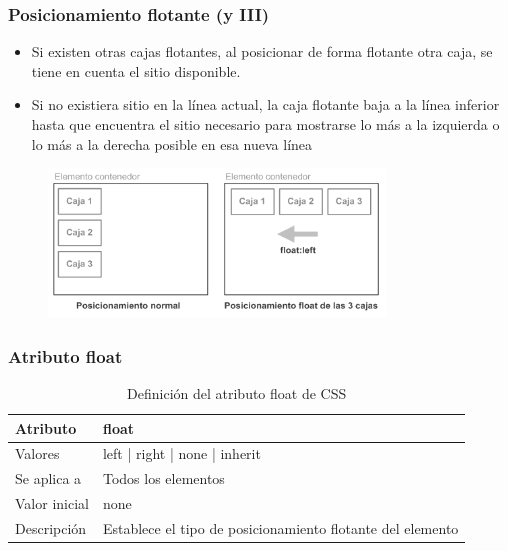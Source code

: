 \documentclass[ucs]{beamer}
\begin{document}
\begin{frame}
\frametitle{Posicionamiento flotante (y III)}

\begin{itemize}
  \item Si existen otras cajas flotantes, al posicionar de forma flotante otra caja, se tiene en cuenta el sitio disponible.
  \item Si no existiera sitio en la línea actual, la caja flotante baja a la línea inferior hasta que encuentra el sitio necesario para mostrarse lo más a la izquierda o lo más a la derecha posible en esa nueva línea
\end{itemize}


\begin{center}
\begin{figure}[p]
\includegraphics[width=0.8\textwidth]{figs/f0509.png}
\end{figure}
\end{center}

\end{frame}



\begin{frame}
\frametitle{Atributo float}

\begin{center}
  \begin{table}
   \begin{tabular}{p{1.8cm}p{7.8cm}}
Atributo & \bf{float} \\ \hline
Valores& left | right | none | inherit \\ \hline
Se aplica a& Todos los elementos \\ \hline
Valor inicial& none \\ \hline
Descripción& Establece el tipo de posicionamiento flotante del elemento \\ \hline
  \end{tabular}
   \caption{Definición del atributo float de CSS}
 \end{table}
\end{center}


\end{frame}
\end{document}
